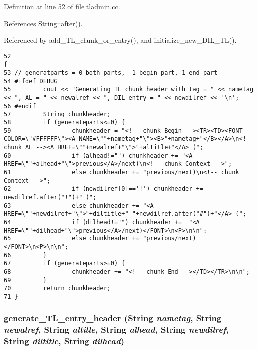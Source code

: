 Definition at line 52 of file tladmin.cc.

References String::after().

Referenced by add\_\-TL\_\-chunk\_\-or\_\-entry(), and initialize\_\-new\_\-DIL\_\-TL().



\footnotesize\begin{verbatim}52                                                                                                                                                                           {
53 // generatparts = 0 both parts, -1 begin part, 1 end part
54 #ifdef DEBUG
55         cout << "Generating TL chunk header with tag = " << nametag << ", AL = " << newalref << ", DIL entry = " << newdilref << '\n';
56 #endif
57         String chunkheader;
58         if (generateparts<=0) {
59                 chunkheader = "<!-- chunk Begin --><TR><TD><FONT COLOR=\"#FFFFFF\"><A NAME=\""+nametag+"\"><B>"+nametag+"</B></A>\n<!-- chunk AL --><A HREF=\""+newalref+"\">"+altitle+"</A> (";
60                 if (alhead!="") chunkheader += "<A HREF=\""+alhead+"\">previous</A>/next)\n<!-- chunk Context -->";
61                 else chunkheader += "previous/next)\n<!-- chunk Context -->";
62                 if (newdilref[0]=='!') chunkheader += newdilref.after("!")+" (";
63                 else chunkheader += "<A HREF=\""+newdilref+"\">"+diltitle+" "+newdilref.after("#")+"</A> (";
64                 if (dilhead!="") chunkheader +=  "<A HREF=\""+dilhead+"\">previous</A>/next)</FONT>\n<P>\n\n";
65                 else chunkheader += "previous/next)</FONT>\n<P>\n\n";
66         }
67         if (generateparts>=0) {
68                 chunkheader += "<!-- chunk End --></TD></TR>\n\n";
69         }
70         return chunkheader;             
71 }
\end{verbatim}\normalsize 
{}
\subsubsection{ generate\_\-TL\_\-entry\_\-header ({\bf String} {\em nametag}, {\bf String} {\em newalref}, {\bf String} {\em altitle}, {\bf String} {\em alhead}, {\bf String} {\em newdilref}, {\bf String} {\em diltitle}, {\bf String} {\em dilhead})}\label{dil2al_8hh_a319}




